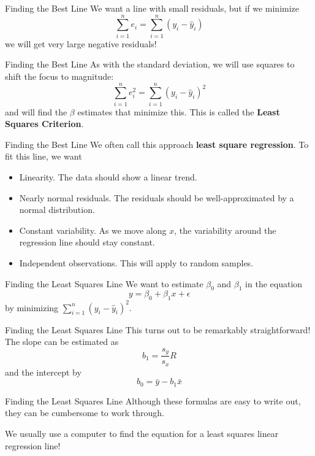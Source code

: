 \begin{frame}{Finding the Best Line}
    We want a line with small residuals, but if we minimize
    \[
        \sum_{i=1}^n e_i = \sum_{i=1}^n (y_i - \hat{y}_i)
    \]
    we will get very large negative residuals!
\end{frame}

\begin{frame}{Finding the Best Line}
    As with the standard deviation, we will use squares to shift the focus to magnitude:
    \[
        \sum_{i=1}^n e_i^2 = \sum_{i=1}^n (y_i - \hat{y}_i)^2
    \]
    and will find the $\beta$ estimates that minimize this. This is called the \textbf{Least Squares Criterion}.
\end{frame}

\begin{frame}{Finding the Best Line}
    We often call this approach \textbf{least square regression}. To fit this line, we want
    \begin{itemize}
        \item Linearity. The data should show a linear trend.
        \item Nearly normal residuals. The residuals should be well-approximated by a normal distribution.
        \item Constant variability. As we move along $x$, the variability around the regression line should stay constant.
        \item Independent observations. This will apply to random samples.
    \end{itemize}
\end{frame}

\begin{frame}{Finding the Least Squares Line}
    We want to estimate $\beta_0$ and $\beta_1$ in the equation
    \[
        y = \beta_0 + \beta_1 x + \epsilon
    \]
    by minimizing $\sum_{i=1}^n (y_i - \hat{y}_i)^2$.
\end{frame}

\begin{frame}{Finding the Least Squares Line}
    This turns out to be remarkably straightforward! The slope can be estimated as
    \[
        b_1 = \frac{s_y}{s_x}R
    \]
    and the intercept by 
    \[
        b_0 = \bar{y} - b_1 \bar{x}
    \]
\end{frame}

\begin{frame}{Finding the Least Squares Line}
    Although these formulas are easy to write out, they can be cumbersome to work through.
    
    \vspace{12pt}We usually use a computer to find the equation for a least squares linear regression line!
\end{frame}

